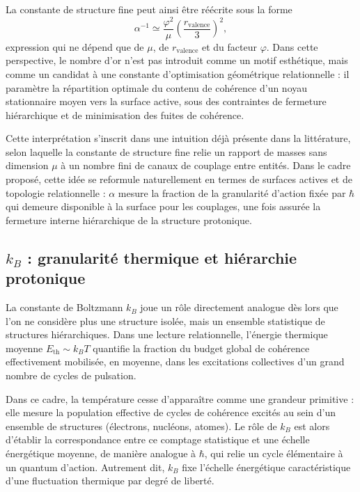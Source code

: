 \documentclass[11pt,a4paper]{article}
\begin{document}
La constante de structure fine peut ainsi être réécrite sous la forme
\[
\alpha^{-1} \simeq \frac{\varphi^{2}}{\mu}\left(\frac{r_{\mathrm{valence}}}{3}\right)^{2},
\]
expression qui ne dépend que de \(\mu\), de \(r_{\mathrm{valence}}\) et du facteur \(\varphi\). Dans cette perspective, le nombre d’or n’est pas introduit comme un motif esthétique, mais comme un candidat à une constante d’optimisation géométrique relationnelle : il paramètre la répartition optimale du contenu de cohérence d’un noyau stationnaire moyen vers la surface active, sous des contraintes de fermeture hiérarchique et de minimisation des fuites de cohérence.

Cette interprétation s’inscrit dans une intuition déjà présente dans la littérature, selon laquelle la constante de structure fine relie un rapport de masses sans dimension \(\mu\) à un nombre fini de canaux de couplage entre entités. Dans le cadre proposé, cette idée se reformule naturellement en termes de surfaces actives et de topologie relationnelle : \(\alpha\) mesure la fraction de la granularité d’action fixée par \(\hbar\) qui demeure disponible à la surface pour les couplages, une fois assurée la fermeture interne hiérarchique de la structure protonique.

\subsection{\texorpdfstring{\(k_B\)}{kB} : granularité thermique et hiérarchie protonique}

La constante de Boltzmann \(k_B\) joue un rôle directement analogue dès lors que l’on ne considère plus une structure isolée, mais un ensemble statistique de structures hiérarchiques. Dans une lecture relationnelle, l’énergie thermique moyenne \(E_{\mathrm{th}} \sim k_B T\) quantifie la fraction du budget global de cohérence effectivement mobilisée, en moyenne, dans les excitations collectives d’un grand nombre de cycles de pulsation.

Dans ce cadre, la température cesse d’apparaître comme une grandeur primitive : elle mesure la population effective de cycles de cohérence excités au sein d’un ensemble de structures (électrons, nucléons, atomes). Le rôle de \(k_B\) est alors d’établir la correspondance entre ce comptage statistique et une échelle énergétique moyenne, de manière analogue à \(\hbar\), qui relie un cycle élémentaire à un quantum d’action. Autrement dit, \(k_B\) fixe l’échelle énergétique caractéristique d’une fluctuation thermique par degré de liberté.
\end{document}

